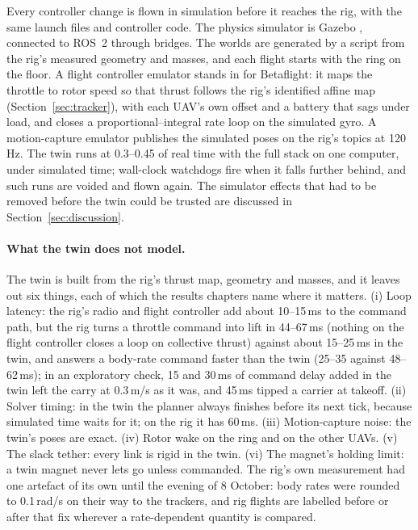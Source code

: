 Every controller change is flown in simulation before it reaches the rig, with the same launch files and
controller code. The physics simulator is Gazebo \cite{koenig2004gazebo}, connected to ROS~2
\cite{macenski2022ros2} through bridges. The worlds are generated by a script from the rig's measured geometry
and masses, and each flight starts with the ring on the floor. A flight controller emulator stands in for
Betaflight: it maps the throttle to rotor speed so that thrust follows the rig's identified affine map
(Section~\ref{sec:tracker}), with each UAV's own offset and a battery that sags under load, and closes a
proportional--integral rate loop on the simulated gyro. A motion-capture emulator publishes the simulated poses
on the rig's topics at 120\,Hz. The twin runs at 0.3--0.45 of real time with the full stack on one computer,
under simulated time; wall-clock watchdogs fire when it falls further behind, and such runs are voided and flown
again. The simulator effects that had to be removed before the twin could be trusted are discussed in
Section~\ref{sec:discussion}.

\paragraph{What the twin does not model.} The twin is built from the rig's thrust map, geometry and masses, and
it leaves out six things, each of which the results chapters name where it matters. (i) Loop latency: the rig's
radio and flight controller add about 10--15\,ms to the command path, but the rig turns a throttle command into lift
in 44--67\,ms (nothing on the flight controller closes a loop on collective thrust) against about 15--25\,ms in the
twin, and answers a body-rate command faster than the twin (25--35 against 48--62\,ms); in an exploratory check, 15 and 30\,ms of command delay added in the twin left the carry at 0.3\,m/s
as it was, and 45\,ms tipped a carrier at takeoff. (ii) Solver
timing: in the twin the planner always finishes before its next tick, because simulated time waits for it; on the
rig it has 60\,ms. (iii) Motion-capture noise: the twin's poses are exact. (iv) Rotor wake on the ring and on the
other UAVs. (v) The slack tether: every link is rigid in the twin. (vi) The magnet's holding limit: a twin magnet
never lets go unless commanded. The rig's own measurement had one artefact of its own until the evening of
8 October: body rates were rounded to 0.1\,rad/s on their way to the trackers, and rig flights are labelled before
or after that fix wherever a rate-dependent quantity is compared.

